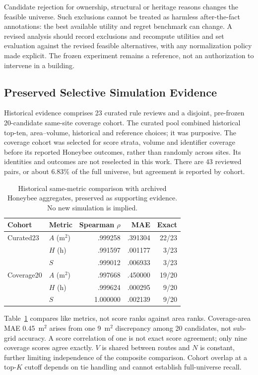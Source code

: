 \documentclass{llncs}
\begin{document}
Candidate rejection for ownership, structural or heritage reasons changes the feasible universe. Such exclusions cannot be treated as harmless after-the-fact annotations: the best available utility and regret benchmark can change. A revised analysis should record exclusions and recompute utilities and set evaluation against the revised feasible alternatives, with any normalization policy made explicit. The frozen experiment remains a reference, not an authorization to intervene in a building.

\subsection{Preserved Selective Simulation Evidence}
Historical evidence comprises 23 curated rule reviews and a disjoint, pre-frozen 20-candidate same-site coverage cohort. The curated pool combined historical top-ten, area--volume, historical and reference choices; it was purposive. The coverage cohort was selected for score strata, volume and identifier coverage before its reported Honeybee outcomes, rather than randomly across sites. Its identities and outcomes are not reselected in this work. There are 43 reviewed pairs, or about 6.83\% of the full universe, but agreement is reported by cohort.

\begin{table}[tbp]\caption{Historical same-metric comparison with archived Honeybee aggregates, preserved as supporting evidence. No new simulation is implied.}\label{tab:agreement}\centering
\begin{tabular}{llrrr}\toprule Cohort & Metric & Spearman $\rho$ & MAE & Exact\\\midrule
Curated23 & $A$ (m$^2$) & .999258 & .391304 & 22/23\\ & $H$ (h) & .991597 & .001177 & 3/23\\ & $S$ & .999012 & .006933 & 3/23\\
Coverage20 & $A$ (m$^2$) & .997668 & .450000 & 19/20\\ & $H$ (h) & .999624 & .000295 & 9/20\\ & $S$ & 1.000000 & .002139 & 9/20\\\bottomrule\end{tabular}\end{table}

Table~\ref{tab:agreement} compares like metrics, not score ranks against area ranks. Coverage-area MAE 0.45~m$^2$ arises from one 9~m$^2$ discrepancy among 20 candidates, not sub-grid accuracy. A score correlation of one is not exact score agreement; only nine coverage scores agree exactly. $V$ is shared between routes and $N$ is constant, further limiting independence of the composite comparison. Cohort overlap at a top-$K$ cutoff depends on tie handling and cannot establish full-universe recall.
\end{document}

